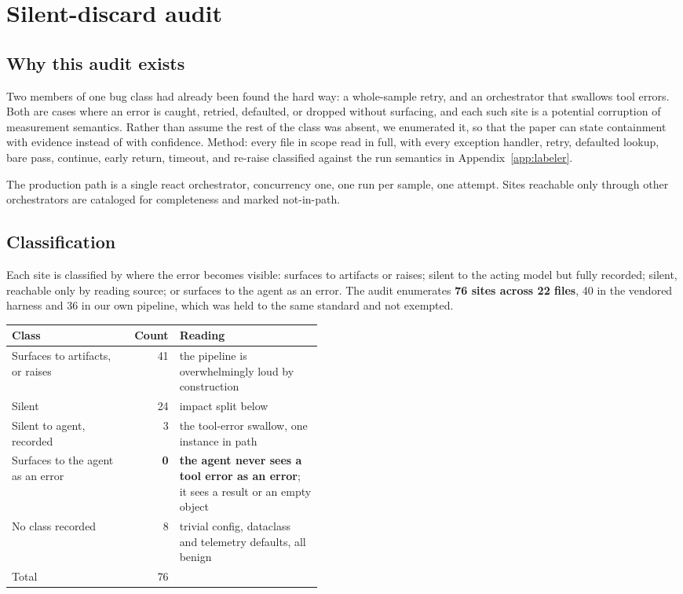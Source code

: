 \section{Silent-discard audit}
\label{app:silent}

\subsection{Why this audit exists}

Two members of one bug class had already been found the hard way: a whole-sample
retry, and an orchestrator that swallows tool errors. Both are cases where an
error is caught, retried, defaulted, or dropped without surfacing, and each such
site is a potential corruption of measurement semantics. Rather than assume the
rest of the class was absent, we enumerated it, so that the paper can state
containment with evidence instead of with confidence. Method: every file in scope
read in full, with every exception handler, retry, defaulted lookup, bare pass,
continue, early return, timeout, and re-raise classified against the run
semantics in Appendix~\ref{app:labeler}.

The production path is a single react orchestrator, concurrency one, one run per
sample, one attempt. Sites reachable only through other orchestrators are
cataloged for completeness and marked not-in-path.

\subsection{Classification}

Each site is classified by where the error becomes visible: surfaces to artifacts
or raises; silent to the acting model but fully recorded; silent, reachable only
by reading source; or surfaces to the agent as an error. The audit enumerates
\textbf{76 sites across 22 files}, 40 in the vendored harness and 36 in our own
pipeline, which was held to the same standard and not exempted.

\begin{table}[h]
\centering
\small
\begin{tabular}{@{}lrp{0.46\linewidth}@{}}
\toprule
Class & Count & Reading \\
\midrule
Surfaces to artifacts, or raises & 41 & the pipeline is overwhelmingly loud by
construction \\
Silent & 24 & impact split below \\
Silent to agent, recorded & 3 & the tool-error swallow, one instance in path \\
Surfaces to the agent as an error & \textbf{0} & \textbf{the agent never sees a
tool error as an error}; it sees a result or an empty object \\
No class recorded & 8 & trivial config, dataclass and telemetry defaults, all
benign \\
\midrule
Total & 76 & \\
\bottomrule
\end{tabular}
\end{table}

